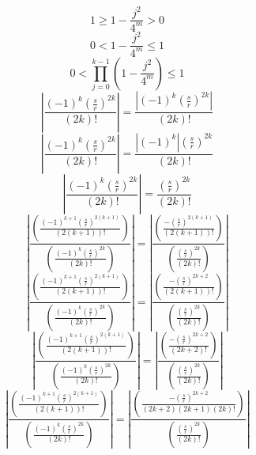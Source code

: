 \documentclass[a4paper,12pt]{report}
\begin{document}
\begin{equation}
1 \geq 1 - \frac{j^2}{4^m} > 0
\end{equation}
\begin{equation}
0 < 1 - \frac{j^2}{4^m} \leq 1
\end{equation}
\begin{equation}
0 < \prod \limits_{j=0}^{k-1} \left(1 - \frac{j^2}{4^m}\right) \leq 1
\end{equation}
\begin{equation}
\left|\frac{(-1)^k \left(\frac{s}{r}\right)^{2k}}{(2k)!}\right| = \frac{\left|(-1)^k \left(\frac{s}{r}\right)^{2k}\right|}{(2k)!}
\end{equation}
\begin{equation}
\left|\frac{(-1)^k \left(\frac{s}{r}\right)^{2k}}{(2k)!}\right| = \frac{\left|(-1)^k\right| \left(\frac{s}{r}\right)^{2k}}{(2k)!}
\end{equation}
\begin{equation}
\left|\frac{(-1)^k \left(\frac{s}{r}\right)^{2k}}{(2k)!}\right| = \frac{\left(\frac{s}{r}\right)^{2k}}{(2k)!}
\end{equation}
\begin{equation}
\left|\frac{\left(\frac{(-1)^{k+1} \left(\frac{s}{r}\right)^{2(k+1)}}{(2(k+1))!}\right)}{\left(\frac{(-1)^k \left(\frac{s}{r}\right)^{2k}}{(2k)!}\right)}\right| = \left|\frac{\left(\frac{-\left(\frac{s}{r}\right)^{2(k+1)}}{(2(k+1))!}\right)}{\left(\frac{\left(\frac{s}{r}\right)^{2k}}{(2k)!}\right)}\right|
\end{equation}
\begin{equation}
\left|\frac{\left(\frac{(-1)^{k+1} \left(\frac{s}{r}\right)^{2(k+1)}}{(2(k+1))!}\right)}{\left(\frac{(-1)^k \left(\frac{s}{r}\right)^{2k}}{(2k)!}\right)}\right| = \left|\frac{\left(\frac{-\left(\frac{s}{r}\right)^{2k+2}}{(2(k+1))!}\right)}{\left(\frac{\left(\frac{s}{r}\right)^{2k}}{(2k)!}\right)}\right|
\end{equation}
\begin{equation}
\left|\frac{\left(\frac{(-1)^{k+1} \left(\frac{s}{r}\right)^{2(k+1)}}{(2(k+1))!}\right)}{\left(\frac{(-1)^k \left(\frac{s}{r}\right)^{2k}}{(2k)!}\right)}\right| = \left|\frac{\left(\frac{-\left(\frac{s}{r}\right)^{2k+2}}{(2k+2)!}\right)}{\left(\frac{\left(\frac{s}{r}\right)^{2k}}{(2k)!}\right)}\right|
\end{equation}
\begin{equation}
\left|\frac{\left(\frac{(-1)^{k+1} \left(\frac{s}{r}\right)^{2(k+1)}}{(2(k+1))!}\right)}{\left(\frac{(-1)^k \left(\frac{s}{r}\right)^{2k}}{(2k)!}\right)}\right| = \left|\frac{\left(\frac{-\left(\frac{s}{r}\right)^{2k+2}}{(2k+2)(2k+1)(2k)!}\right)}{\left(\frac{\left(\frac{s}{r}\right)^{2k}}{(2k)!}\right)}\right|
\end{equation}
\end{document}
